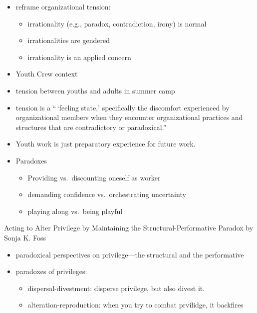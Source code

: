 \documentclass[
]{book}
\begin{document}
\citep{Trethewey_2004}

\begin{itemize}
\item
  reframe organizational tension:

  \begin{itemize}
  \item
    irrationality (e.g., paradox, contradiction, irony) is normal
  \item
    irrationalities are gendered
  \item
    irrationality is an applied concern
  \end{itemize}
\end{itemize}

\citep{Way_2019}

\begin{itemize}
\item
  Youth Crew context
\item
  tension between youths and adults in summer camp
\item
  tension is a ``\,`feeling state,' specifically the discomfort experienced by organizational members when they encounter organizational practices and structures that are contradictory or paradoxical.'' \citep{Putnam_2016}
\item
  Youth work is just preparatory experience for future work.
\item
  Paradoxes

  \begin{itemize}
  \item
    Providing vs.~discounting oneself as worker
  \item
    demanding confidence vs.~orchestrating uncertainty
  \item
    playing along vs.~being playful
  \end{itemize}
\end{itemize}

Acting to Alter Privilege by Maintaining the Structural-Performative Paradox by Sonja K. Foss

\begin{itemize}
\item
  paradoxical perspectives on privilege---the structural and the performative
\item
  paradoxes of privileges:

  \begin{itemize}
  \item
    dispersal-divestment: disperse privilege, but also divest it.
  \item
    alteration-reproduction: when you try to combat prvilidge, it backfires
  \end{itemize}
\end{itemize}
\end{document}
